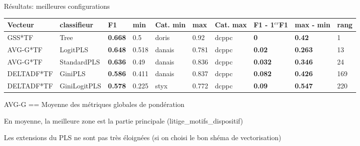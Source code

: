 \documentclass[newPxFont,pagenumber]{beamer}
\begin{document}
\begin{frame}{Résultats: meilleures configurations}
\begin{table}[]
\tiny
\label{my-label}
\begin{tabular}{|l|l|l|l|l|l|l|l|l|l|}
\hline
\textbf{Vecteur} & \textbf{classifieur} & \textbf{F1} & \textbf{min} & \textbf{Cat. min} & \textbf{max} & \textbf{Cat. max} & \textbf{F1 - 1$^{er}$F1} & \textbf{max - min} & \textbf{rang} \\ \hline
GSS*TF                 & Tree                & \textbf{0.668}     & 0.5                 & doris                  & 0.92               & dcppc                 & \textbf{0}                    & \textbf{0.42}           & 1             \\ \hline
AVG-G*TF      & LogitPLS         & \textbf{0.648}     & 0.518               & danais                 & 0.781              & dcppc                 & \textbf{0.02}                 & \textbf{0.263}          & 13            \\ \hline
AVG-G*TF      & StandardPLS      & \textbf{0.636}     & 0.49                & danais                 & 0.836              & dcppc                 & \textbf{0.032}                & \textbf{0.346}          & 24            \\ \hline
DELTADF*TF             & GiniPLS          & \textbf{0.586}     & 0.411               & danais                 & 0.837              & dcppc                 & \textbf{0.082}                & \textbf{0.426}          & 169           \\ \hline
DELTADF*TF             & GiniLogitPLS     & \textbf{0.578}     & 0.225               & styx                   & 0.772              & dcppc                 & \textbf{0.09}                 & \textbf{0.547}          & 220           \\ \hline
\end{tabular}
AVG-G == Moyenne des métriques globales de pondération
\end{table}
\scriptsize

En moyenne, la meilleure zone est la partie principale (litige\_motifs\_dispositif)

Les extensions du PLS ne sont pas très éloignées (si on choisi le bon shéma de vectorisation)

\end{frame}
\end{document}
